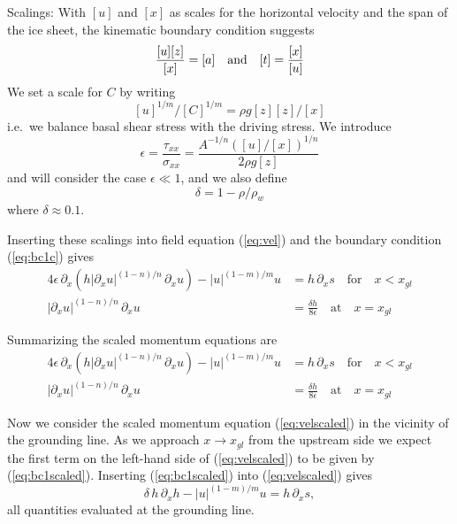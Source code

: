 \documentclass[10pt,a4paper]{book}
\newcommand{\p}{\partial}
\newcommand{\txx}{\tau_{xx}}
\newcommand{\sxx}{\sigma_{xx}}
\begin{document}
Scalings: With $[u]$ and $[x]$ as scales for the horizontal velocity
and the span of the ice sheet, the kinematic boundary condition suggests
\[
\frac{[u] [z]}{[x]}= [a] \quad \hbox{and} \quad [t]=\frac{[x]}{[u]}
\]
We set a scale for $C$ by writing
\[
[u]^{1/m}/[C]^{1/m}=\rho g [z] [z]/[x]
\]
i.e.\ we balance basal shear stress with the driving stress.
We introduce
\begin{equation}
  \epsilon=\frac{\txx}{\sxx} = \frac{A^{-1/n} ([u]/[x])^{1/n}}{2 \rho g [z]} 
\end{equation}
and will consider the case $\epsilon \ll 1$, and we also define
\begin{equation}
  \delta=1-\rho/\rho_w  
\end{equation}
where $\delta\approx 0.1$.


Inserting these scalings into field equation (\ref{eq:vel}) and the boundary condition (\ref{eq:bc1c})
gives
\begin{align}
4 \epsilon \, \p_x \left (h |\p_x u|^{(1-n)/n} \, \p_x u \right ) - |u|^{(1-m)/m} u & = h \, \p_x s \quad \text{for} \quad x<x_{gl} \label{eq:velscaled}\\
|\p_x u|^{(1-n)/n} \, \p_x u&= \frac{\delta h}{8 \epsilon} \quad \text{at} \quad x=x_{gl} \label{eq:bc1scaled}
\end{align}




Summarizing the scaled momentum equations are
\begin{align}
4 \epsilon \, \p_x \left (h |\p_x u|^{(1-n)/n} \, \p_x u \right ) - |u|^{(1-m)/m} u & = h \, \p_x s \quad \text{for} \quad x<x_{gl} \label{eq:velscaled2}\\
|\p_x u|^{(1-n)/n} \, \p_x u&= \frac{\delta h}{8 \epsilon} \quad \text{at} \quad x=x_{gl} \label{eq:bc1scaledb}
\end{align}


Now we consider the scaled momentum equation (\ref{eq:velscaled}) in the
vicinity of the grounding line. As we approach $x \to x_{gl}$ from
the upstream side we expect the first term on the left-hand side of
(\ref{eq:velscaled}) to be given by (\ref{eq:bc1scaled}). Inserting
(\ref{eq:bc1scaled}) into (\ref{eq:velscaled}) gives
\begin{equation}
\delta  \, h \, \p_x h   - |u|^{(1-m)/m} u  = h \, \p_x s ,
\label{eq:sc3}
\end{equation}
all quantities evaluated at the grounding line.
\end{document}
